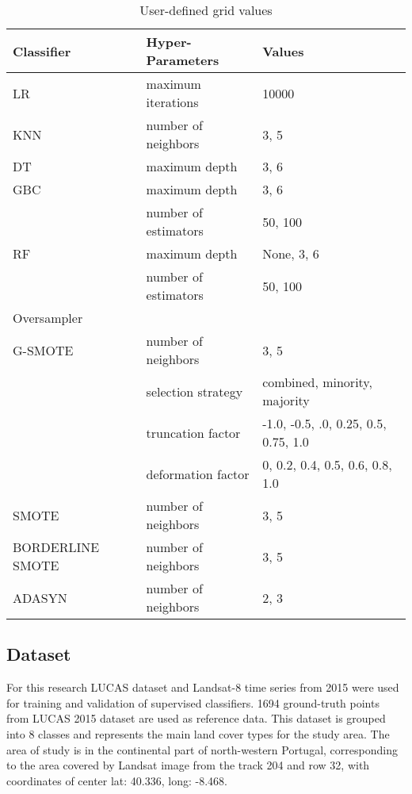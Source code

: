 \documentclass[remotesensing,article,submit,moreauthors,pdftex]{Definitions/mdpi}
\begin{document}
\begin{table}[H]
	\centering
	\begin{tabular}{lll}
		\toprule
		Classifier       & Hyper-Parameters & Values\\
		\hline
		LR               & maximum iterations   & 10000   \\
		KNN              & number of neighbors  & {3, 5} \\
		DT               & maximum depth        & {3, 6} \\
		GBC              & maximum depth        & {3, 6} \\
    			 		 & number of estimators & {50, 100} \\
		RF               & maximum depth        & {None, 3, 6} \\
				 		 & number of estimators & {50, 100} \\
		\toprule
		Oversampler      &                      & \\
		\hline
		G-SMOTE          & number of neighbors  & {3, 5} \\
				 		 & selection strategy   & combined, minority, majority\\
				 		 & truncation factor    & {-1.0, -0.5, .0, 0.25, 0.5,
				 		 0.75, 1.0} \\
				 		 & deformation factor   & {0, 0.2, 0.4, 0.5, 0.6, 0.8,
				 		 1.0} \\
 		SMOTE            & number of neighbors & {3, 5} \\
		BORDERLINE SMOTE & number of neighbors & {3, 5} \\
		ADASYN           & number of neighbors & {2, 3} \\
		\bottomrule
	\end{tabular}
	\caption{\label{tab:grid}User-defined grid values}
\end{table}


\subsection{Dataset}

For this research LUCAS dataset and Landsat-8 time series from 2015 were used
for training and validation of supervised classifiers. 1694 ground-truth points
from LUCAS 2015 dataset are used as reference data. This dataset is grouped into
8 classes and represents the main land cover types for the study area. The area
of study is in the continental part of north-western Portugal, corresponding to
the area covered by Landsat image from the track 204 and row 32, with
coordinates of center lat: 40.336, long: -8.468.
\end{document}
